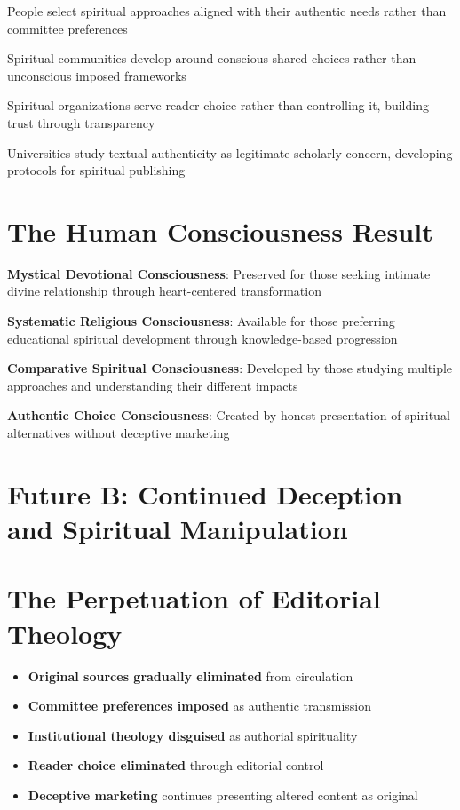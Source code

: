 \documentclass[11pt,twoside]{book}
\begin{document}
People select spiritual approaches aligned with their authentic needs rather than committee preferences

Spiritual communities develop around conscious shared choices rather than unconscious imposed frameworks

Spiritual organizations serve reader choice rather than controlling it, building trust through transparency

Universities study textual authenticity as legitimate scholarly concern, developing protocols for spiritual publishing
\section*{The Human Consciousness Result}
\label{sec:org67d09fb}
\textbf{\textbf{Mystical Devotional Consciousness}}: Preserved for those seeking intimate divine relationship through heart-centered transformation

\textbf{\textbf{Systematic Religious Consciousness}}: Available for those preferring educational spiritual development through knowledge-based progression

\textbf{\textbf{Comparative Spiritual Consciousness}}: Developed by those studying multiple approaches and understanding their different impacts

\textbf{\textbf{Authentic Choice Consciousness}}: Created by honest presentation of spiritual alternatives without deceptive marketing
\section*{Future B: Continued Deception and Spiritual Manipulation}
\label{sec:org786e851}

\section*{The Perpetuation of Editorial Theology}
\label{sec:orgdc63295}
\begin{itemize}
\item \textbf{\textbf{Original sources gradually eliminated}} from circulation
\item \textbf{\textbf{Committee preferences imposed}} as authentic transmission
\item \textbf{\textbf{Institutional theology disguised}} as authorial spirituality
\item \textbf{\textbf{Reader choice eliminated}} through editorial control
\item \textbf{\textbf{Deceptive marketing}} continues presenting altered content as original
\end{itemize}
\end{document}
